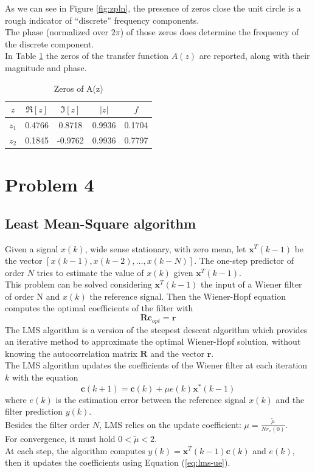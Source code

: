 \documentclass[a4paper, 12pt]{report}
\begin{document}
As we can see in Figure \ref{fig:zpln}, the presence of zeros close the unit circle is a rough indicator of ``discrete'' frequency components.\\
The phase (normalized over $2 \pi$) of those zeros does determine the frequency of the discrete component.\\
In Table \ref{tab:errpred} the zeros of the transfer function $A(z)$ are reported, along with their magnitude and phase.


\begin{table}[H]
\centering
\begin{tabular}{ccccc}
\toprule
$z$		& $\Re[z]$ 	& $\Im[z]$			& $|z|$			& $f$ \\
\midrule
$z_1$ 	& 0.4766	& 0.8718			& 0.9936		& 0.1704 \\
$z_2$	& 0.1845	& -0.9762			& 0.9936		& 0.7797 \\
\bottomrule
\end{tabular}
\caption{Zeros of A(z)}
\label{tab:errpred}
\end{table}


\section*{Problem 4}

\subsection*{Least Mean-Square algorithm}
Given a signal $x(k)$, wide sense stationary, with zero mean, let $\mathbf{x}^T(k-1)$ be the vector $[x(k-1), x(k-2), \dots, x(k-N)]$. The one-step predictor of order $N$ tries to estimate the value of $x(k)$ given $\mathbf{x}^T(k-1)$.\\
This problem can be solved considering $\mathbf{x}^T(k-1)$ the input of a Wiener filter of order N and $x(k)$ the reference signal. Then the Wiener-Hopf equation computes the optimal coefficients of the filter with
\begin{equation}
	\mathbf{R} \mathbf{c}_{opt} = \mathbf{r}
\end{equation}
The LMS algorithm is a version of the steepest descent algorithm which provides an iterative method to approximate the optimal Wiener-Hopf solution, without knowing the autocorrelation matrix $\mathbf{R}$ and the vector $\mathbf{r}$.\\
The LMS algorithm updates the coefficients of the Wiener filter at each iteration $k$ with the equation
\begin{equation}\label{eq:lms-ue}
	\mathbf{c}(k+1) = \mathbf{c}(k) + \mu e(k) \mathbf{x}^*(k-1)
\end{equation}
where $e(k)$ is the estimation error between the reference signal $x(k)$ and the filter prediction $y(k)$.\\
Besides the filter order $N$, LMS relies on the update coefficient: $\mu = \frac{\tilde{\mu}}{N r_x(0)}$.\\
For convergence, it must hold $0 < \tilde{\mu} < 2$.\\
At each step, the algorithm computes $ y(k) = \mathbf{x}^T(k-1) \mathbf{c}(k)$ and $e(k)$, then it updates the coefficients using Equation (\ref{eq:lms-ue}).
\end{document}
